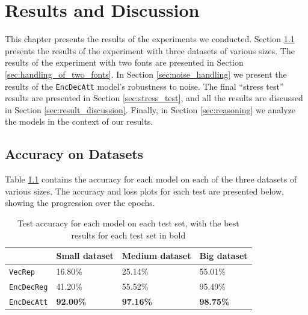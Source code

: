 
\chapter{Results and Discussion}
\label{ch:results}
This chapter presents the results of the experiments we conducted. Section \ref{sec:accuracy_on_datasets_results} presents the results of the experiment with three datasets of various sizes. The results of the experiment with two fonts are presented in Section \ref{sec:handling_of_two_fonts}. In Section \ref{sec:noise_handling} we present the results of the {\tt EncDecAtt} model's robustness to noise. The final ``stress test'' results are presented in Section \ref{sec:stress_test}, and all the results are discussed in Section \ref{sec:result_discussion}. Finally, in Section \ref{sec:reasoning} we analyze the models in the context of our results.


\section{Accuracy on Datasets}
\label{sec:accuracy_on_datasets_results}
Table \ref{table:accuracy_model_data_sets} contains the accuracy for each model on each of the three datasets of various sizes. The accuracy and loss plots for each test are presented below, showing the progression over the epochs.

\begin{table}[h]
    \centering
    \begin{tabular}{|l|l|l|l|}
        \hline 
                                        & \textbf{Small dataset}          & \textbf{Medium dataset}         & \textbf{Big dataset}            \\ \hline
        {\tt VecRep }                   & 16.80\%                         & 25.14\%                         & 55.01\%                         \\ \hline
        {\tt EncDecReg}                 & 41.20\%                         & 55.52\%                         & 95.49\%                         \\ \hline
        {\tt EncDecAtt}                 & \textbf{92.00\%}                & \textbf{97.16\%}                & \textbf{98.75\%}                \\ \hline
    \end{tabular}
    \captionsetup{justification=centering}
    \caption{Test accuracy for each model on each test set, with the best results for each test set in bold}
    \label{table:accuracy_model_data_sets}
\end{table}

